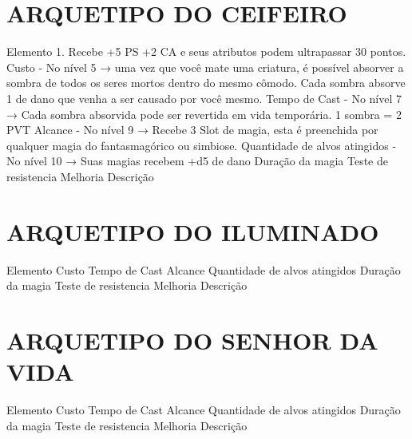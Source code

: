 \documentclass{article}%
\begin{document}
%
\section{ARQUETIPO DO CEIFEIRO}%
\label{sec:ARQUETIPODOCEIFEIRO}%
Elemento 1. Recebe +5 PS +2 CA e seus atributos podem ultrapassar 30 pontos.\newline%
Custo {-} No nível 5 → uma vez que você mate uma criatura, é possível absorver a sombra de todos os seres mortos dentro do mesmo cômodo. Cada sombra absorve 1 de dano que venha a ser causado por você mesmo.\newline%
Tempo de Cast {-} No nível 7 → Cada sombra absorvida pode ser revertida em vida temporária. 1 sombra = 2 PVT\newline%
Alcance {-} No nível 9 → Recebe 3 Slot de magia, esta é preenchida por qualquer magia do fantasmagórico ou simbiose.\newline%
Quantidade de alvos atingidos {-} No nível 10 → Suas magias recebem +d5 de dano\newline%
Duração da magia \newline%
Teste de resistencia \newline%
Melhoria \newline%
Descrição \newline%

%
\section{ARQUETIPO DO ILUMINADO}%
\label{sec:ARQUETIPODOILUMINADO}%
Elemento \newline%
Custo \newline%
Tempo de Cast \newline%
Alcance \newline%
Quantidade de alvos atingidos \newline%
Duração da magia \newline%
Teste de resistencia \newline%
Melhoria \newline%
Descrição \newline%

%
\section{ARQUETIPO DO SENHOR DA VIDA}%
\label{sec:ARQUETIPODOSENHORDAVIDA}%
Elemento \newline%
Custo \newline%
Tempo de Cast \newline%
Alcance \newline%
Quantidade de alvos atingidos \newline%
Duração da magia \newline%
Teste de resistencia \newline%
Melhoria \newline%
Descrição \newline%
\end{document}

